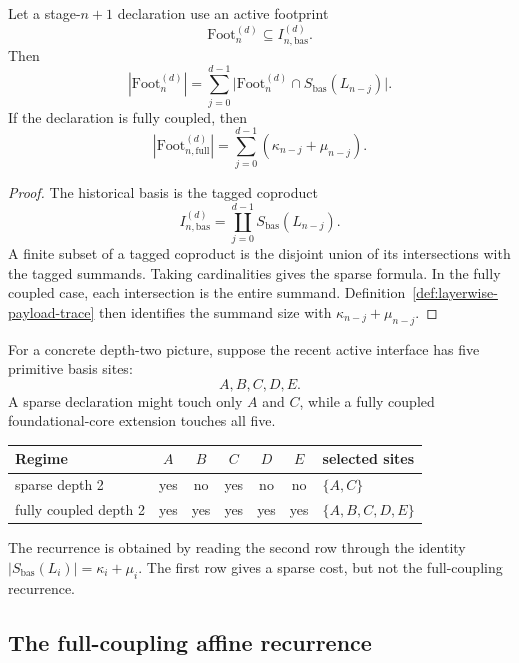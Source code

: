 \begin{lemma}
\label{lem:window-cardinality}
Let a stage-\(n+1\) declaration use an active footprint
\[
  \mathrm{Foot}^{(d)}_n \subseteq I^{(d)}_{n,\mathrm{bas}}.
\]
Then
\[
  |\mathrm{Foot}^{(d)}_n|
  =
  \sum_{j=0}^{d-1}
  \bigl|\mathrm{Foot}^{(d)}_n \cap S_{\mathrm{bas}}(L_{n-j})\bigr|.
\]
If the declaration is fully coupled, then
\[
  |\mathrm{Foot}^{(d)}_{n,\mathrm{full}}|
  =
  \sum_{j=0}^{d-1}
  (\kappa_{n-j}+\mu_{n-j}).
\]
\end{lemma}

\begin{proof}
The historical basis is the tagged coproduct
\[
  I^{(d)}_{n,\mathrm{bas}}
  =
  \coprod_{j=0}^{d-1} S_{\mathrm{bas}}(L_{n-j}).
\]
A finite subset of a tagged coproduct is the disjoint union of its intersections with the
tagged summands.  Taking cardinalities gives the sparse formula.  In the fully coupled case,
each intersection is the entire summand.  Definition~\ref{def:layerwise-payload-trace} then
identifies the summand size with \(\kappa_{n-j}+\mu_{n-j}\).
\end{proof}

For a concrete depth-two picture, suppose the recent active interface has five primitive basis
sites:
\[
  A, B, C, D, E.
\]
A sparse declaration might touch only \(A\) and \(C\), while a fully coupled foundational-core
extension touches all five.

\begin{center}
\begin{tabular}{lccccc l}
\hline
Regime & \(A\) & \(B\) & \(C\) & \(D\) & \(E\) & selected sites \\
\hline
sparse depth 2 & yes & no & yes & no & no & \(\{A,C\}\) \\
fully coupled depth 2 & yes & yes & yes & yes & yes & \(\{A,B,C,D,E\}\) \\
\hline
\end{tabular}
\end{center}

The recurrence is obtained by reading the second row through the identity
\(|S_{\mathrm{bas}}(L_i)|=\kappa_i+\mu_i\).  The first row gives a sparse cost, but not the
full-coupling recurrence.

\subsection{The full-coupling affine recurrence}
\label{subsec:full-coupling-recurrence}

